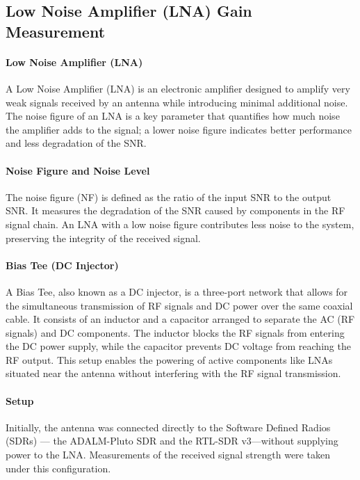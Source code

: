 \documentclass[12pt,letter]{article}
\begin{document}
\subsection*{Low Noise Amplifier (LNA) Gain Measurement}

\paragraph*{Low Noise Amplifier (LNA)}
A Low Noise Amplifier (LNA) is an electronic amplifier designed to amplify very weak signals received by an antenna while introducing minimal additional noise.  The noise figure of an LNA is a key parameter that quantifies how much noise the amplifier adds to the signal; a lower noise figure indicates better performance and less degradation of the SNR.

\paragraph*{Noise Figure and Noise Level}
The noise figure (NF) is defined as the ratio of the input SNR to the output SNR. It measures the degradation of the SNR caused by components in the RF signal chain. An LNA with a low noise figure contributes less noise to the system, preserving the integrity of the received signal. 

\paragraph*{Bias Tee (DC Injector)}
A Bias Tee, also known as a DC injector, is a three-port network that allows for the simultaneous transmission of RF signals and DC power over the same coaxial cable. It consists of an inductor and a capacitor arranged to separate the AC (RF signals) and DC components. The inductor blocks the RF signals from entering the DC power supply, while the capacitor prevents DC voltage from reaching the RF output. This setup enables the powering of active components like LNAs situated near the antenna without interfering with the RF signal transmission.


\paragraph*{Setup}
Initially, the antenna was connected directly to the Software Defined Radios (SDRs) — the ADALM-Pluto SDR and the RTL-SDR v3—without supplying power to the LNA. Measurements of the received signal strength were taken under this configuration.
\end{document}
